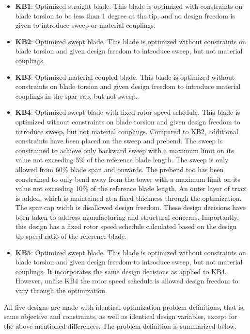 \begin{itemize}
	\item \textbf{KB1}: Optimized straight blade. This blade is optimized with constraints on blade torsion to be less than 1 degree at the tip, and no design freedom is given to introduce sweep or material couplings.
	\item \textbf{KB2}: Optimized swept blade. This blade is optimized without constraints on blade torsion and given design freedom to introduce sweep, but not material couplings.
	\item \textbf{KB3}: Optimized material coupled blade. This blade is optimized without constraints on blade torsion and given design freedom to introduce material couplings in the spar cap, but not sweep.
	\item \textbf{KB4}: Optimized swept blade with fixed rotor speed schedule. This blade is optimized without constraints on blade torsion and given design freedom to introduce sweep, but not material couplings. Compared to KB2, additional constraints have been placed on the sweep and prebend. The sweep is constrained to achieve only backward sweep with a maximum limit on its value not exceeding 5\% of the reference blade length. The sweep is only allowed from 60\% blade span and onwards. The prebend too has been constrained to only bend away from the tower with a maximum limit on its value not exceeding 10\% of the reference blade length. An outer layer of triax is added, which is maintained at a fixed thickness through the optimization. The spar cap width is disallowed design freedom. These design decisions have been taken to address manufacturing and structural concerns. Importantly, this design has a fixed rotor speed schedule calculated based on the design tip-speed ratio of the reference blade. 
	\item \textbf{KB5}: Optimized swept blade. This blade is optimized without constraints on blade torsion and given design freedom to introduce sweep, but not material couplings. It incorporates the same design decisions as applied to KB4. However, unlike KB4 the rotor speed schedule is allowed design freedom to vary through the optimization. 
\end{itemize}

All five designs are made with identical optimization problem definitions, that is, same objective and constraints, as well as identical design variables, except for the above mentioned differences. The problem definition is summarized below.

